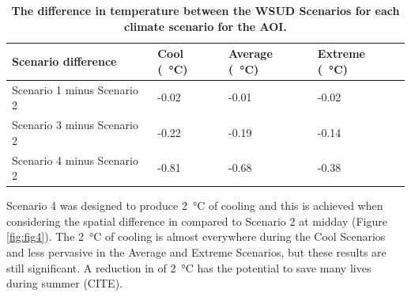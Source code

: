 \documentclass[final,3p,times,authoryear]{elsarticle}
\begin{document}
\begin{table}[!htbp]
\caption{\bf The difference in  temperature between the WSUD Scenarios for each climate scenario for the AOI. \label{tab:scenarioDiffRep2}}     
\begin{tabular}{ l l l l}
\textbf{Scenario difference} & \textbf{Cool (\SI{}{\degreeCelsius})}
& \textbf{Average (\SI{}{\degreeCelsius})}
& \textbf{Extreme (\SI{}{\degreeCelsius})}\\ \hline
Scenario 1 minus Scenario 2 & -0.02  & -0.01 & -0.02\\ 
Scenario 3 minus Scenario 2 & -0.22  & -0.19 & -0.14\\ 
Scenario 4 minus Scenario 2 & -0.81  & -0.68 & -0.38\\ 
\hline
\end{tabular}
\end{table}

Scenario 4 was designed to produce 2\SI{}{\degreeCelsius} of cooling and this is achieved when considering the spatial difference in  compared to Scenario 2 at midday (Figure \ref{fig:fig4}). The 2\SI{}{\degreeCelsius} of cooling is almost everywhere during the Cool Scenarios and less pervasive in the Average and Extreme Scenarios, but these results are still significant. A reduction in  of 2\SI{}{\degreeCelsius} has the potential to save many lives during summer (CITE).
\end{document}
